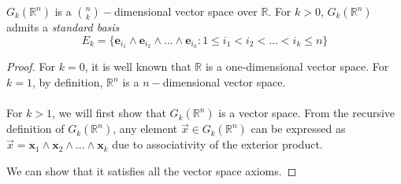 \documentclass{article}
\numberwithin{equation}{section}
\newcommand{\R}{\mathbb{R}}
\newcommand{\ve}{\mathbf}
\begin{document}
\begin{proposition}
    $G_k(\R^n)$ is a $\binom{n}{k}-$dimensional vector space over $\R$. For $k>0$, $G_k(\R^n)$ admits a \textit{standard basis}
    \begin{equation}
        E_k=\{\ve e_{i_1}\wedge\ve e_{i_2}\wedge\dots\wedge\ve e_{i_k}:1\leq i_1<i_2<\dots<i_k\leq n\}
    \end{equation}
    \begin{proof}
        For $k=0$, it is well known that $\R$ is a one-dimensional vector space. For $k=1$, by definition, $\R^n$ is a $n-$dimensional vector space.
\\\\
        For $k>1$, we will first show that $G_k(\R^n)$ is a vector space. From the recursive definition of $G_k(\R^n)$, any element $\vec x\in G_k(\R^n)$ can be expressed as $\vec x=\ve x_1\wedge\ve x_2\wedge...\wedge\ve x_k$ due to associativity of the exterior product.

        We can show that it satisfies all the vector space axioms. 

        

\end{proof}
\end{proposition}
\end{document}

